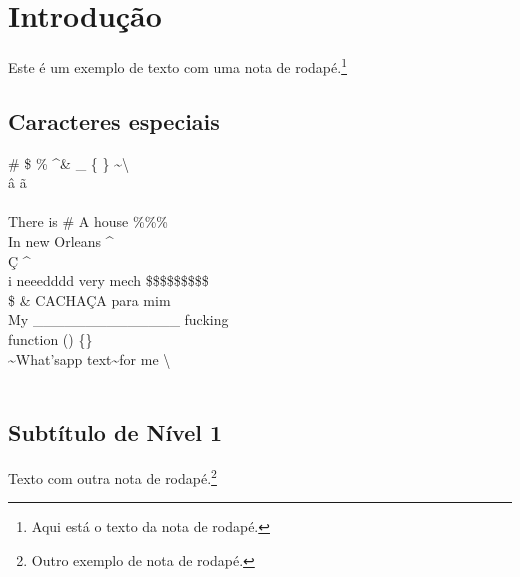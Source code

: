\documentclass[12pt,a4paper,oneside,brazil]{abntex2}
\begin{document}

\listoffigures   %
\clearpage

\listoftables    %
\clearpage

\printglossary[type=abrev,title=Lista de Abreviaturas]
\clearpage

\printglossary[type=siglas,title=Lista de Siglas]
\clearpage

\printglossary[type=simbolos,title=Lista de Símbolos]
\clearpage

\tableofcontents
\clearpage



\setcounter{page}{1}
\textual

\justifying
\normalfont

\chapter{Introdução}
Este é um exemplo de texto com uma nota de rodapé.\footnote{Aqui está o texto da nota de rodapé.} \lipsum[1]

\section{Caracteres especiais}
\#     \$     \%     \textasciicircum     \&     \_     \{     \}     \textasciitilde     \textbackslash \\
â ã
\\
\\
There is \# A house \%\%\%\\
In new Orleans \textasciicircum \\
Ç \textasciicircum \\
i neeedddd very mech \$\$\$\$\$\$\$\$\$\\
\$ \& CACHAÇA para mim\\
My \_\_\_\_\_\_\_\_\_\_\_\_\_\_ fucking\\
function () \{\}\\
\textasciitilde What'sapp text\textasciitilde  for me \textbackslash\\\\

\section{Subtítulo de Nível 1}
Texto com outra nota de rodapé.\footnote{Outro exemplo de nota de rodapé.} \lipsum[2-3]
\end{document}
